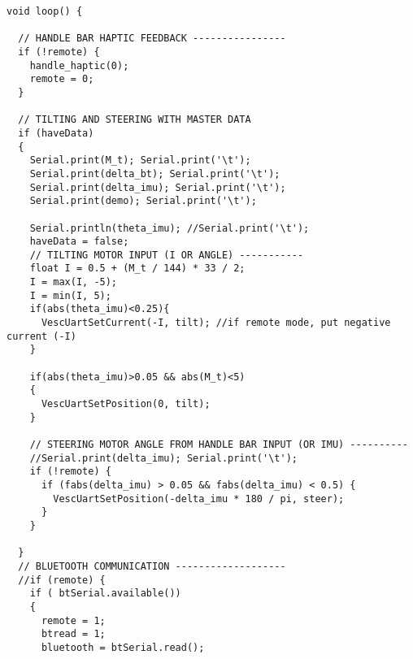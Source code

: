 \begin{lstlisting}[style=codearduino]
void loop() {

  // HANDLE BAR HAPTIC FEEDBACK ----------------
  if (!remote) {
    handle_haptic(0);
    remote = 0;
  }

  // TILTING AND STEERING WITH MASTER DATA
  if (haveData)
  {
    Serial.print(M_t); Serial.print('\t');
    Serial.print(delta_bt); Serial.print('\t');
    Serial.print(delta_imu); Serial.print('\t');
    Serial.print(demo); Serial.print('\t');

    Serial.println(theta_imu); //Serial.print('\t');
    haveData = false;
    // TILTING MOTOR INPUT (I OR ANGLE) -----------
    float I = 0.5 + (M_t / 144) * 33 / 2;
    I = max(I, -5);
    I = min(I, 5);
    if(abs(theta_imu)<0.25){
      VescUartSetCurrent(-I, tilt); //if remote mode, put negative current (-I)
    }

    if(abs(theta_imu)>0.05 && abs(M_t)<5)
    {
      VescUartSetPosition(0, tilt);
    }

    // STEERING MOTOR ANGLE FROM HANDLE BAR INPUT (OR IMU) ----------
    //Serial.print(delta_imu); Serial.print('\t');
    if (!remote) {
      if (fabs(delta_imu) > 0.05 && fabs(delta_imu) < 0.5) {
        VescUartSetPosition(-delta_imu * 180 / pi, steer);
      }
    }

  }
  // BLUETOOTH COMMUNICATION -------------------
  //if (remote) {
    if ( btSerial.available())
    {
      remote = 1;
      btread = 1;
      bluetooth = btSerial.read();


\end{lstlisting}
